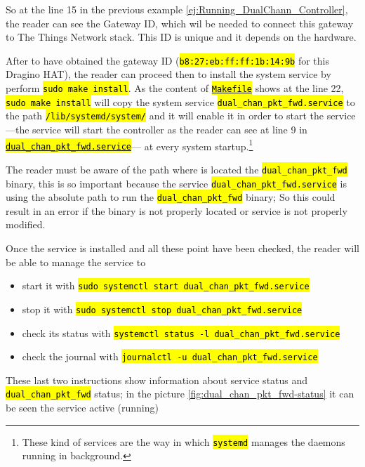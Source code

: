 \documentclass[11pt,a4paper,dvipsnames,twoside]{article}
\newcommand{\cmd}[1] {\hl{\texttt{#1}}}
\begin{document}
So at the line 15 in the previous example \ref{ej:Running_DualChann_Controller}, the reader can see the Gateway ID, which wil be needed to connect this gateway to The Things Network stack. This ID is unique and it depends on the hardware.

After to have obtained the gateway ID (\cmd{b8:27:eb:ff:ff:1b:14:9b} for this Dragino HAT), the reader can proceed then to install the system service by perform \cmd{sudo make install}. As the content of \href{https://github.com/dragino/dual_chan_pkt_fwd/blob/master/Makefile#L22}{\cmd{Makefile}} shows at the line 22, \cmd{sudo make install} will copy the system service \cmd{dual\_chan\_pkt\_fwd.service} to the path \cmd{/lib/systemd/system/} and it will enable it in order to start the service ---the service will start the controller as the reader can see at line 9 in \href{https://github.com/dragino/dual_chan_pkt_fwd/blob/master/dual_chan_pkt_fwd.service#L9}{\cmd{dual\_chan\_pkt\_fwd.service}}--- at every system startup.\footnote{These kind of services are the way in which \cmd{systemd} manages the daemons running in background.} 

The reader must be aware of the path where is located the \cmd{dual\_chan\_pkt\_fwd} binary, this is so important because the service \cmd{dual\_chan\_pkt\_fwd.service} is using the absolute path to run the \cmd{dual\_chan\_pkt\_fwd} binary; So this could result in an error if the binary is not properly located or service is not properly modified.

Once the service is installed and all these point have been checked, the reader will be able to manage the service to

\begin{itemize}
  \item start it with \cmd{sudo systemctl start dual\_chan\_pkt\_fwd.service}
  \item stop it with \cmd{sudo systemctl stop dual\_chan\_pkt\_fwd.service}
  \item check its status with \cmd{systemctl status -l dual\_chan\_pkt\_fwd.service}
  \item check the journal with \cmd{journalctl -u dual\_chan\_pkt\_fwd.service}
\end{itemize}

These last two instructions show information about service status and \cmd{dual\_chan\_pkt\_fwd} status; in the picture \ref{fig:dual_chan_pkt_fwd-status} it can be seen the service active (running)
\end{document}
